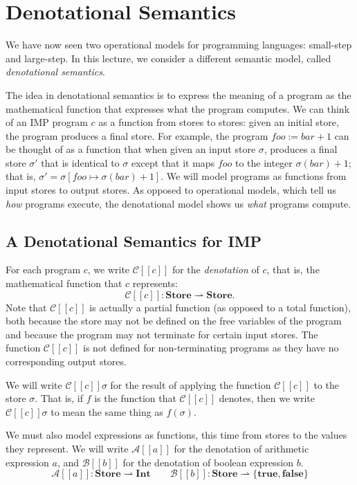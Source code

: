 % 

\chapter{Denotational Semantics}

We have now seen two operational models for programming languages: small-step and large-step.
In this lecture, we consider a different semantic model, called \emph{denotational semantics}.

The idea in denotational semantics is to express the meaning of a program as the mathematical
function that expresses what the program computes. We can think of an IMP program $c$ as a
function from stores to stores: given an initial store, the program produces a final store. For
example, the program $\mathit{foo} := \mathit{bar} + 1$ can be thought of as a function that
when given an input store $\sigma$, produces a final store $\sigma'$ that is identical to
$\sigma$ except that it maps $\mathit{foo}$ to the integer $\sigma(\mathit{bar}) + 1$; that is,
$\sigma' = \sigma[\mathit{foo} \mapsto \sigma(\mathit{bar}) + 1]$. We will model programs as
functions from input stores to output stores. As opposed to operational models, which tell us
\emph{how} programs execute, the denotational model shows us \emph{what} programs compute.

\section{A Denotational Semantics for IMP}

For each program $c$, we write $\mathcal{C}[\![c]\!]$ for the \emph{denotation} of $c$, that
is, the mathematical function that $c$ represents:
\[
\mathcal{C}[\![c]\!] : \mathbf{Store} \rightharpoonup \mathbf{Store}.
\]
Note that $\mathcal{C}[\![c]\!]$ is actually a partial function (as opposed to a total
function), both because the store may not be defined on the free variables of the program and
because the program may not terminate for certain input stores. The function
$\mathcal{C}[\![c]\!]$ is not defined for non-terminating programs as they have no
corresponding output stores.

We will write $\mathcal{C}[\![c]\!]\sigma$ for the result of applying the function
$\mathcal{C}[\![c]\!]$ to the store $\sigma$. That is, if $f$ is the function that
$\mathcal{C}[\![c]\!]$ denotes, then we write $\mathcal{C}[\![c]\!]\sigma$ to mean the same
thing as $f(\sigma)$.

We must also model expressions as functions, this time from stores to the values they
represent. We will write $\mathcal{A}[\![a]\!]$ for the denotation of arithmetic expression
$a$, and $\mathcal{B}[\![b]\!]$ for the denotation of boolean expression $b$.
\[
\mathcal{A}[\![a]\!] : \mathbf{Store} \rightharpoonup \mathbf{Int}
\qquad
\mathcal{B}[\![b]\!] : \mathbf{Store} \rightharpoonup \{\mathbf{true}, \mathbf{false}\}
\]

